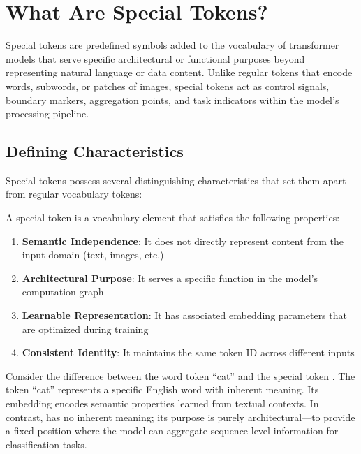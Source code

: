 \section{What Are Special Tokens?}

Special tokens are predefined symbols added to the vocabulary of transformer models that serve specific architectural or functional purposes beyond representing natural language or data content. Unlike regular tokens that encode words, subwords, or patches of images, special tokens act as control signals, boundary markers, aggregation points, and task indicators within the model's processing pipeline.
\begin{comment}
Feedback: This is a good, dense definition. To make it more accessible, you could use an analogy. For example: "If a regular token is like a word in a sentence, a special token is like punctuation, a paragraph break, or even the title of the document. They provide structure and context rather than content."
\end{comment}

\subsection{Defining Characteristics}

Special tokens possess several distinguishing characteristics that set them apart from regular vocabulary tokens:

\begin{definition}
A special token is a vocabulary element that satisfies the following properties:
\begin{enumerate}
\item \textbf{Semantic Independence}: It does not directly represent content from the input domain (text, images, etc.)
\item \textbf{Architectural Purpose}: It serves a specific function in the model's computation graph
\item \textbf{Learnable Representation}: It has associated embedding parameters that are optimized during training
\item \textbf{Consistent Identity}: It maintains the same token ID across different inputs
\end{enumerate}
\end{definition}

Consider the difference between the word token ``cat'' and the special token \cls{}. The token ``cat'' represents a specific English word with inherent meaning. Its embedding encodes semantic properties learned from textual contexts. In contrast, \cls{} has no inherent meaning; its purpose is purely architectural---to provide a fixed position where the model can aggregate sequence-level information for classification tasks.

